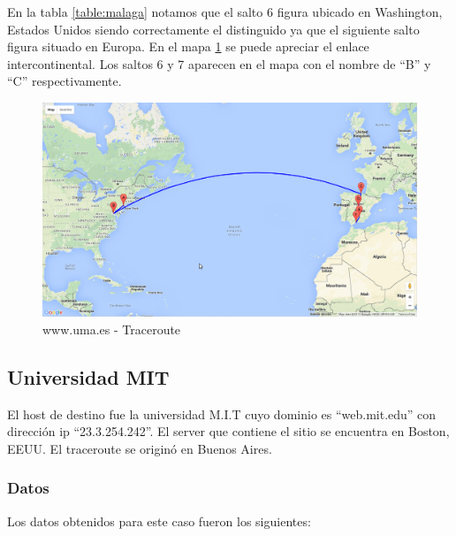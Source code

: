 En la tabla \ref{table:malaga} notamos que el salto 6 figura ubicado en Washington, Estados Unidos siendo correctamente el distinguido ya que el siguiente salto figura situado en Europa. En el mapa \ref{mapa:malaga} se puede apreciar el enlace intercontinental. Los saltos 6 y 7 aparecen en el mapa con el nombre de ``B'' y ``C'' respectivamente.


\begin{figure}[H]
    \begin{center}
        \includegraphics[width=1\textwidth]{data/mapa-malaga.png}
        \caption{www.uma.es - Traceroute}
        \label{mapa:malaga}
    \end{center}
\end{figure}






\subsection{Universidad MIT}
El host de destino fue la universidad M.I.T cuyo dominio es ``web.mit.edu'' con dirección ip ``23.3.254.242''. El server que contiene el sitio se encuentra en Boston, EEUU. El traceroute se originó en Buenos Aires.


\subsubsection{Datos}

Los datos obtenidos para este caso fueron los siguientes:

